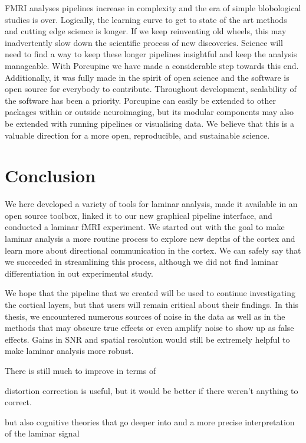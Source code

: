 FMRI analyses pipelines increase in complexity and the era of simple blobological studies is over. Logically, the learning curve to get to state of the art methods and cutting edge science is longer. If we keep reinventing old wheels, this may inadvertently slow down the scientific process of new discoveries. Science will need to find a way to keep these longer pipelines insightful and keep the analysis manageable. With Porcupine we have made a considerable step towards this end. Additionally, it was fully made in the spirit of open science and the software is open source for everybody to contribute. Throughout development, scalability of the software has been a priority. Porcupine can easily be extended to other packages within or outside neuroimaging, but its modular components may also be extended with running pipelines or visualising data. We believe that this is a valuable direction for a more open, reproducible, and sustainable science.







\section{Conclusion}
We here developed a variety of tools for laminar analysis, made it available in an open source toolbox, linked it to our new graphical pipeline interface, and conducted a laminar fMRI experiment. We started out with the goal to make laminar analysis a more routine process to explore new depths of the cortex and learn more about directional communication in the cortex. We can safely say that we succeeded in streamlining this process, although we did not find laminar differentiation in out experimental study.

 We hope that the pipeline that we created will be used to continue investigating the cortical layers, but that users will remain critical about their findings. In this thesis, we encountered numerous sources of noise in the data as well as in the methods that may obscure true effects or even amplify noise to show up as false effects. Gains in SNR and spatial resolution would still be extremely helpful to make laminar analysis more robust. 


There is still much to improve in terms of 

distortion correction is useful, but it would be better if there weren't anything to correct. 

but also cognitive theories that go deeper into 
and a more precise interpretation of the laminar signal


\linespread{1.5}
\newpage






